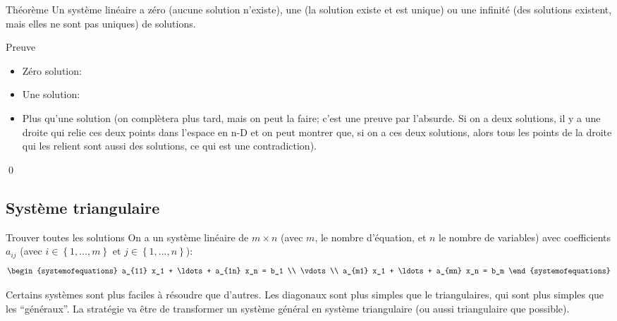 \documentclass{article}
\begin{document}
\begin{parag}{Théorème}
    Un système linéaire a zéro (aucune solution n'existe), une (la solution existe et est unique) ou une infinité (des solutions existent, mais elles ne sont pas uniques) de solutions.

    \begin{subparag}{Preuve}
        \begin{itemize}[left=0pt]
            \item Zéro solution:
            \item Une solution:
            \item Plus qu'une solution (on complètera plus tard, mais on peut la faire; c'est une preuve par l'absurde. Si on a deux solutions, il y a une droite qui relie ces deux points dans l'espace en n-D et on peut montrer que, si on a ces deux solutions, alors tous les points de la droite qui les relient sont aussi des solutions, ce qui est une contradiction).
        \end{itemize}
        \qed
    \end{subparag}
\end{parag}

\subsection{Système triangulaire}
\begin{parag}{Trouver toutes les solutions}
    On a un système linéaire de $m \times n$ (avec $m$, le nombre d'équation, et $n$ le nombre de variables) avec coefficients $a_{ij}$ (avec $i \in \left\{1, \ldots, m\right\}$ et $j \in \left\{1, \ldots, n\right\}$):
    \[\begin{systemofequations}
    a_{11} x_1 + \ldots + a_{1n} x_n = b_1 \\
    \vdots \\
    a_{m1} x_1 + \ldots + a_{mn} x_n = b_m
    \end{systemofequations}\]

    Certains systèmes sont plus faciles à résoudre que d'autres. Les diagonaux sont plus simples que le triangulaires, qui sont plus simples que les ``généraux''.  La stratégie va être de transformer un système général en système triangulaire (ou aussi triangulaire que possible).
\end{parag}
\end{document}
